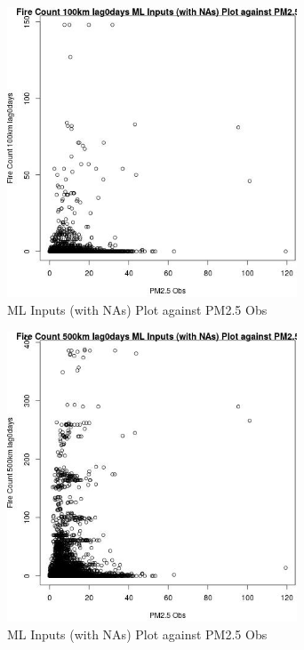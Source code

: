 \begin{figure} 
\centering  
\includegraphics[width=0.77\textwidth]{Code_Outputs/Report_ML_input_PM25_Step4_part_e_de_duplicated_aves_compiled_2019-05-18wNAs_Fire_Count_100km_lag0daysvPM25_Obs.jpg} 
\caption{\label{fig:Report_ML_input_PM25_Step4_part_e_de_duplicated_aves_compiled_2019-05-18wNAsFire_Count_100km_lag0daysvPM25_Obs}ML Inputs (with NAs) Plot against PM2.5 Obs} 
\end{figure} 
 

\begin{figure} 
\centering  
\includegraphics[width=0.77\textwidth]{Code_Outputs/Report_ML_input_PM25_Step4_part_e_de_duplicated_aves_compiled_2019-05-18wNAs_Fire_Count_500km_lag0daysvPM25_Obs.jpg} 
\caption{\label{fig:Report_ML_input_PM25_Step4_part_e_de_duplicated_aves_compiled_2019-05-18wNAsFire_Count_500km_lag0daysvPM25_Obs}ML Inputs (with NAs) Plot against PM2.5 Obs} 
\end{figure} 
 


